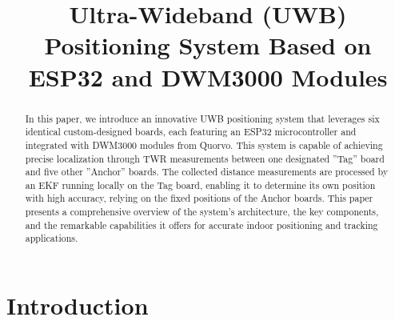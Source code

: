 \documentclass[conference, a4paper]{IEEEtran}
\begin{document}
\renewcommand{\baselinestretch}{0.97} %

\title{Ultra-Wideband (UWB) Positioning System Based on ESP32 and DWM3000 Modules}

\author{  
   \and
   
  }

\maketitle

\begin{abstract}
  In this paper, we introduce an innovative \ac{UWB} positioning system
  that leverages six identical custom-designed boards,
  each featuring an ESP32 microcontroller and integrated with DWM3000
  modules from Quorvo.
  \newline
  This system is capable of achieving precise localization through \ac{TWR}
  measurements between one designated ''Tag'' board and five other ''Anchor'' boards.
  The collected distance measurements are processed by an \ac{EKF} running locally
  on the Tag board, enabling it to determine its own position with high accuracy,
  relying on the fixed positions of the Anchor boards.
  \newline
  This paper presents a comprehensive overview of the system's architecture,
  the key components, and the remarkable capabilities it offers for accurate
  indoor positioning and tracking applications.
\end{abstract}


\IEEEpeerreviewmaketitle


\section{Introduction}
\label{sec:Introduction}
\end{document}
